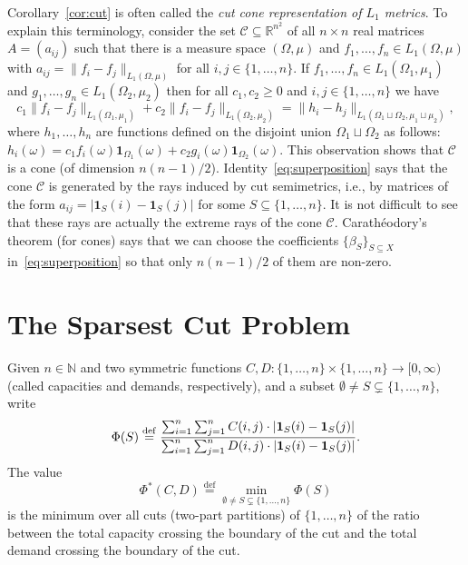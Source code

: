 \documentclass{icm2010}
\theoremstyle{definition}
\newcommand{\R}{\mathbb{R}}
\newcommand{\eqdef}{\stackrel{\mathrm{def}}{=}}
\newcommand{\1}{\mathbf{1}}
\newcommand{\N}{\mathbb{N}}
\renewcommand{\ge}{\geqslant}
\begin{document}
Corollary~\eqref{cor:cut} is often called the {\em cut cone
representation of $L_1$ metrics}. To explain this terminology,
consider the set $\mathscr C\subseteq \R^{n^2}$ of all $n\times n$
real matrices $A=(a_{ij})$ such that there is a measure space
$(\Omega,\mu)$ and $f_1,\ldots,f_n\in L_1(\Omega,\mu)$ with
$a_{ij}=\|f_i-f_j\|_{L_1(\Omega,\mu)}$ for all $i,j\in
\{1,\ldots,n\}$. If $f_1,\ldots,f_n\in L_1(\Omega_1,\mu_1)$ and
$g_1,\ldots,g_n\in L_1(\Omega_2,\mu_2)$ then for all $c_1,c_2\ge 0$
and $i,j\in \{1,\ldots,n\}$ we have
$$c_1\|f_i-f_j\|_{L_1(\Omega_1,\mu_1)}+c_2\|f_i-f_j\|_{L_1(\Omega_2,\mu_2)}
=\|h_i-h_j\|_{L_1(\Omega_1\sqcup\Omega_2,\mu_1\sqcup\mu_2)},$$ where
$h_1,\ldots,h_n$ are functions defined on the disjoint union
$\Omega_1\sqcup\Omega_2$ as follows:
$h_i(\omega)=c_1f_i(\omega)\1_{\Omega_1}(\omega)+c_2g_i(\omega)\1_{\Omega_2}(\omega)$.
This observation shows that $\mathscr C$ is a cone (of dimension
$n(n-1)/2$). Identity~\eqref{eq:superposition} says that the cone
$\mathscr C$ is generated by the rays induced by cut semimetrics,
i.e., by matrices of the form $a_{ij}=|\1_S(i)-\1_S(j)|$ for some
$S\subseteq \{1,\ldots,n\}$. It is not difficult to see that these
rays are actually the extreme rays of the cone $\mathscr C$.
Carath\'eodory's theorem (for cones) says that we can choose the
coefficients $\{\beta_S\}_{S\subseteq X}$
in~\eqref{eq:superposition} so that only $n(n-1)/2$ of them are
non-zero.




\section{The Sparsest Cut Problem}


Given $n\in \N$ and two symmetric functions
$C,D:\{1,\ldots,n\}\times\{1,\ldots,n\}\to [0,\infty)$ (called
capacities and demands, respectively), and a subset $\emptyset\neq S
\subsetneq \{1,\ldots,n\}$, write
\begin{equation}\label{eq:defPhi}
\Phi(S) \eqdef \frac{\sum_{i=1}^n\sum_{j=1}^n C(i,j) \cdot |{\bf
1}_S(i) - {\bf 1}_S(j)|}
               {\sum_{i=1}^n\sum_{j=1}^n D(i,j) \cdot |{\bf 1}_S(i) - {\bf 1}_S(j)|}.
\end{equation}
 The value
\begin{equation}\label{eq:defPhi*}
\Phi^*(C,D) \eqdef \min_{\emptyset\neq S \subsetneq \{1,\ldots,n\}} \Phi(S)\end{equation}
 is
the minimum over all cuts (two-part partitions) of $\{1,\ldots,n\}$ of the
ratio between the total capacity crossing the boundary of the cut
and the total demand crossing the boundary of the cut.
\end{document}
